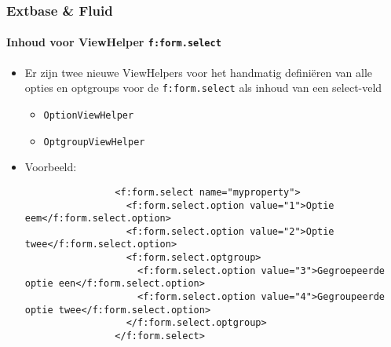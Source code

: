 \begin{frame}[fragile]
	\frametitle{Extbase \& Fluid}
	\framesubtitle{Inhoud voor ViewHelper \texttt{f:form.select}}

	\lstset{basicstyle=\tiny\ttfamily}

	\begin{itemize}
		\item Er zijn twee nieuwe ViewHelpers voor het handmatig definiëren van alle opties en
		 	optgroups voor de \texttt{f:form.select} als inhoud van een select-veld

			\begin{itemize}
				\item \texttt{OptionViewHelper}
				\item \texttt{OptgroupViewHelper}
			\end{itemize}

		\item Voorbeeld:

			\begin{lstlisting}
				<f:form.select name="myproperty">
				  <f:form.select.option value="1">Optie eem</f:form.select.option>
				  <f:form.select.option value="2">Optie twee</f:form.select.option>
				  <f:form.select.optgroup>
				    <f:form.select.option value="3">Gegroepeerde optie een</f:form.select.option>
				    <f:form.select.option value="4">Gegroupeerde optie twee</f:form.select.option>
				  </f:form.select.optgroup>
				</f:form.select>
			\end{lstlisting}

		\end{itemize}

\end{frame}

